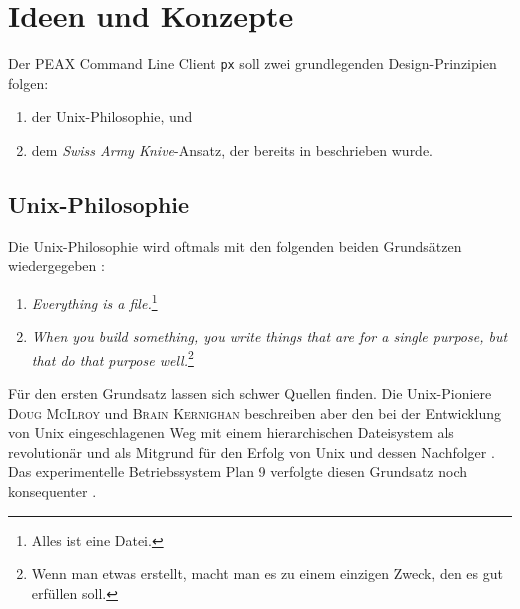 \section{Ideen und Konzepte}
\label{sec:Ideen-und-Konzepte}

Der PEAX Command Line Client \texttt{px} soll zwei grundlegenden Design-Prinzipien folgen:

\begin{enumerate}
    \item der Unix-Philosophie, und
    \item dem \textit{Swiss Army Knive}-Ansatz, der bereits in  beschrieben wurde.
\end{enumerate}

\subsection{Unix-Philosophie}

Die Unix-Philosophie wird oftmals mit den folgenden beiden Grundsätzen wiedergegeben \cite[12:51]{the-code-linux}:

\begin{enumerate}
    \item \textit{Everything is a file.}\footnote{Alles ist eine Datei.}
    \item \textit{When you build something, you write things that are for a single purpose, but that do that purpose well.}\footnote{Wenn man etwas erstellt, macht man es zu einem einzigen Zweck, den es gut erfüllen soll.}
\end{enumerate}

Für den ersten Grundsatz lassen sich schwer Quellen finden. Die Unix-Pioniere \textsc{Doug McIlroy} und \textsc{Brain Kernighan} beschreiben aber den bei der Entwicklung von Unix eingeschlagenen Weg mit einem hierarchischen Dateisystem als revolutionär und als Mitgrund für den Erfolg von Unix und dessen Nachfolger \cite[Kapitel 4.1, S. 62-62, und Kapitel 9.1, S. 166]{unix-history-memoir}. Das experimentelle Betriebssystem Plan 9 verfolgte diesen Grundsatz noch konsequenter \cite[Kapitel 8.4, S. 161]{unix-history-memoir}.

